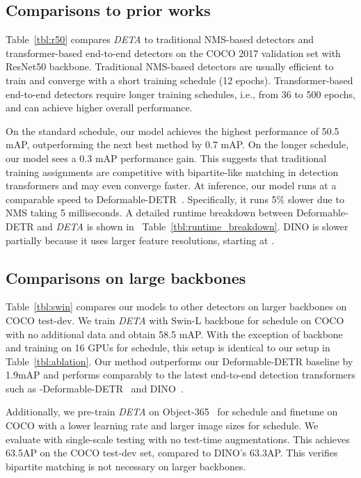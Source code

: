 \documentclass[10pt,twocolumn,letterpaper]{article}
\newcommand{\nmsdets}{{NMS-based detectors\xspace}}
\newcommand{\reftbl}[1]{Table~\ref{tbl:#1}}
\newcommand{\lblsec}[1]{\label{sec:#1}}
\def\name{{\textit{DETA}}\xspace}
\begin{document}
\subsection{Comparisons to prior works}
\lblsec{prior_works}


\reftbl{r50} compares \name to traditional \nmsdets{} and transformer-based end-to-end detectors on the COCO 2017 validation set with ResNet50 backbone.
Traditional \nmsdets{} are usually efficient to train and converge with a short training schedule (12 epochs).
Transformer-based end-to-end detectors require longer training schedules, i.e., from 36 to 500 epochs, and can achieve higher overall performance.

On the standard  schedule, our model achieves the highest performance of 50.5 mAP, outperforming the next best method by 0.7 mAP.
On the longer  schedule, our model sees a 0.3 mAP performance gain.
This suggests that traditional training assignments are competitive with bipartite-like matching in detection transformers and may even converge faster.
At inference, our model runs at a comparable speed to Deformable-DETR~\cite{zhu2020deformable}.
Specifically, it runs 5\% slower due to NMS taking 5 milliseconds.
A detailed runtime breakdown between Deformable-DETR and \name is shown in ~\reftbl{runtime_breakdown}.
DINO is slower partially because it uses larger feature resolutions, starting at .




\subsection{Comparisons on large backbones}
\lblsec{larger_backbones}
\reftbl{swin} compares our models to other detectors on larger backbones on COCO test-dev.
We train \name with Swin-L backbone for  schedule on COCO with no additional data and obtain 58.5 mAP.
With the exception of backbone and training on 16 GPUs for  schedule, this setup is identical to our setup in \reftbl{ablation}.
Our method outperforms our Deformable-DETR baseline by 1.9mAP and performs comparably to the latest end-to-end detection transformers such as -Deformable-DETR~\cite{jia2022detrs} and DINO~\cite{zhang2022dino}.

Additionally, we pre-train \name on Object-365~\cite{gao2019objects365} for  schedule and finetune on COCO with a lower learning rate and larger image sizes for  schedule.
We evaluate with single-scale testing with no test-time augmentations.
This achieves 63.5AP on the COCO test-dev set, compared to DINO's 63.3AP.
This verifies bipartite matching is not necessary on larger backbones.
\end{document}
